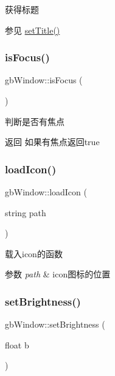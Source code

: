 获得标题 

\begin{DoxySeeAlso}{参见}
\mbox{\hyperlink{classgb_window_a17f154d7c86e29d7337fe46cc183c5dc}{set\+Title()}} 
\end{DoxySeeAlso}
\mbox{\label{classgb_window_a2e2392232e1ddb4ee301dc8069ab6230}} 
\subsubsection{\texorpdfstring{isFocus()}{isFocus()}}
{\footnotesize\ttfamily gb\+Window\+::is\+Focus (\begin{DoxyParamCaption}{ }\end{DoxyParamCaption})}



判断是否有焦点 

\begin{DoxyReturn}{返回}
如果有焦点返回true 
\end{DoxyReturn}
\mbox{\label{classgb_window_a7afc7ded286b296fa5f2a324cbd065ff}} 
\subsubsection{\texorpdfstring{loadIcon()}{loadIcon()}}
{\footnotesize\ttfamily gb\+Window\+::load\+Icon (\begin{DoxyParamCaption}\item[{string}]{path }\end{DoxyParamCaption})\hspace{0.3cm}{\ttfamily [protected]}}



载入icon的函数 


\begin{DoxyParams}{参数}
{\em path} & icon图标的位置 \\
\hline
\end{DoxyParams}
\mbox{\label{classgb_window_aec17f885a0d2dcf1a6d281799542071a}} 
\subsubsection{\texorpdfstring{setBrightness()}{setBrightness()}}
{\footnotesize\ttfamily gb\+Window\+::set\+Brightness (\begin{DoxyParamCaption}\item[{float}]{b }\end{DoxyParamCaption})}



